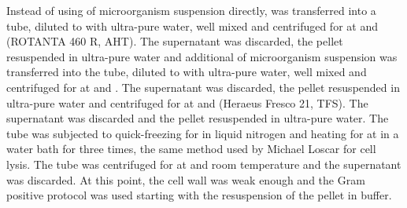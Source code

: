 Instead of using  of microorganism suspension directly,  was transferred into a  tube, diluted to  with ultra-pure water, well mixed and centrifuged for  at  and  (ROTANTA 460 R, AHT). The supernatant was discarded, the pellet resuspended in  ultra-pure water and additional  of microorganism suspension was transferred into the tube, diluted to  with ultra-pure water, well mixed and centrifuged for  at  and . The supernatant was discarded, the pellet resuspended in  ultra-pure water and centrifuged for  at  and  (Heraeus Fresco 21, TFS). The supernatant was discarded and the pellet resuspended in  ultra-pure water. The tube was subjected to quick-freezing for  in liquid nitrogen and heating for  at  in a water bath for three times, the same method used by Michael Loscar for cell lysis. The tube was centrifuged for  at  and room temperature and the supernatant was discarded. At this point, the cell wall was weak enough and the Gram positive protocol was used starting with the resuspension of the pellet in   buffer.

